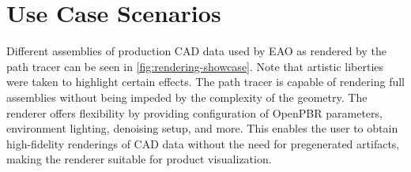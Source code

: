 \newpage
\section{Use Case Scenarios}

Different assemblies of production \gls{CAD} data used by EAO as rendered by the path tracer can be seen in \autoref{fig:rendering-showcase}. Note that artistic liberties were taken to highlight certain effects. The path tracer is capable of rendering full assemblies without being impeded by the complexity of the geometry. The renderer offers flexibility by providing configuration of \gls{OpenPBR} parameters, environment lighting, denoising setup, and more. This enables the user to obtain high-fidelity renderings of \gls{CAD} data without the need for pregenerated artifacts, making the renderer suitable for product visualization.

